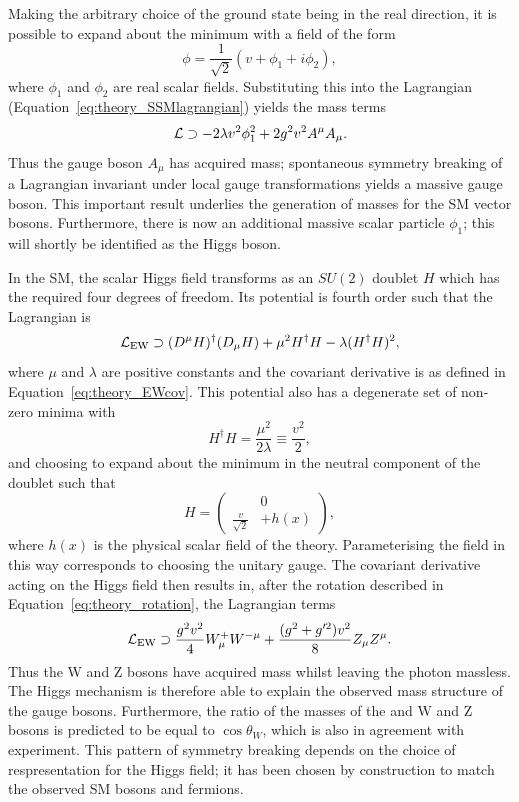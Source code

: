 Making the arbitrary choice of the ground state being in the real direction, 
it is possible to expand about the minimum with a field of the form
\begin{equation}
\phi = \frac{1}{\sqrt{2}} (v + \phi_1 + i\phi_2) ,
\end{equation}
where $\phi_1$ and $\phi_2$ are real scalar fields.
Substituting this into the Lagrangian (Equation~\ref{eq:theory_SSMlagrangian}) yields the mass terms
\begin{equation}
\mathcal{L} \supset - 2 \lambda v^2 \phi^2_1 + 2 g^2 v^2 A^\mu A_\mu .
\end{equation}
Thus the gauge boson $A_\mu$ has acquired mass;
spontaneous symmetry breaking of a Lagrangian invariant under local gauge transformations 
yields a massive gauge boson. 
This important result underlies the generation of masses for the SM vector bosons.
Furthermore, there is now an additional massive scalar particle $\phi_1$;
this will shortly be identified as the Higgs boson.

In the SM, the scalar Higgs field transforms as an $SU(2)$ doublet $H$ 
which has the required four degrees of freedom. 
Its potential is fourth order such that the Lagrangian is
\begin{equation}
\mathcal{L}_{\textrm{EW}} \supset (D^\mu H)^\dagger (D_\mu H) + \mu^2 H^\dagger H - \lambda (H^\dagger H)^2 ,
\end{equation}
where $\mu$ and $\lambda$ are positive constants 
and the covariant derivative is as defined in Equation~\ref{eq:theory_EWcov}.
This potential also has a degenerate set of non-zero minima with 
\begin{equation}
H^\dagger H = \frac{\mu^2}{2\lambda} \equiv \frac{v^2}{2} , 
\end{equation}
and choosing to expand about the minimum in the neutral component of the doublet such that 
\begin{equation}
H = \left(
\begin{split}
&0 \\
\frac{v}{\sqrt{2}} &+ h(x)
\end{split}
\right) ,
\end{equation}
where $h(x)$ is the physical scalar field of the theory.
Parameterising the field in this way corresponds to choosing the unitary gauge.
The covariant derivative acting on the Higgs field then results in, 
after the rotation described in Equation~\ref{eq:theory_rotation}, the Lagrangian terms
\begin{equation}
\mathcal{L}_{\textrm{EW}} \supset \frac{g^2v^2}{4} W^+_\mu W^{-\mu} 
                         + \frac{(g^2 + g^{\prime 2})v^2}{8} Z_\mu Z^\mu .
\end{equation}
Thus the W and Z bosons have acquired mass whilst leaving the photon massless.
The Higgs mechanism is therefore able to explain the observed mass structure of the gauge bosons.
Furthermore, the ratio of the masses of the and W and Z bosons 
is predicted to be equal to $\cos{\theta_W}$, which is also in agreement with experiment.
This pattern of symmetry breaking depends on the choice of respresentation for the Higgs field;
it has been chosen by construction to match the observed SM bosons and fermions. %

